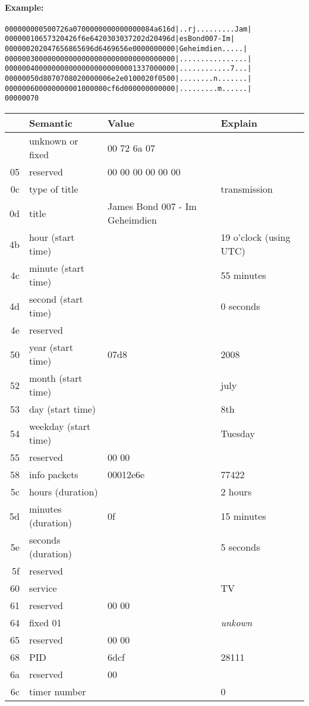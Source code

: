 \documentclass{scrartcl}
\providecommand*\toprule{\hline}
\providecommand*\midrule{\hline}
\providecommand*\bottomrule{\hline}
\begin{document}
\paragraph{Example:}
{\small
\begin{alltt}
00000000  05 00 72 6a 07 00 00 00  00 00 00 00 08 4a 61 6d  |..rj.........Jam|
00000010  65 73 20 42 6f 6e 64 20  30 30 37 20 2d 20 49 6d  |es Bond 007 - Im|
00000020  20 47 65 68 65 69 6d 64  69 65 6e 00 00 00 00 00  | Geheimdien.....|
00000030  00 00 00 00 00 00 00 00  00 00 00 00 00 00 00 00  |................|
00000040  00 00 00 00 00 00 00 00  00 00 00 13 37 00 00 00  |............7...|
00000050  d8 07 07 08 02 00 00 00  6e 2e 01 00 02 0f 05 00  |........n.......|
00000060  00 00 00 00 01 00 00 00  cf 6d 00 00 00 00 00 00  |.........m......|
00000070
\end{alltt}
}

\noindent\begin{tabularx}{\textwidth}{>{\ttfamily}r@{:\hskip2\tabcolsep}l>{\ttfamily}l>{\raggedright}X}
    \toprule
    \multicolumn1{r@{\quad}}{Pos.} & Semantic & Value & Explain\tabularnewline
    \midrule
    00 & unknown or fixed & 05 00 72 6a 07 & \tabularnewline{}
    05 & reserved      & 00 00 00 00 00 00 00 & \tabularnewline{}
    0c & type of title & 08 & transmission\tabularnewline{}
    0d & title         & James Bond 007 - Im Geheimdien & \tabularnewline{}
    4b & hour (start time) & 13 & 19 o'clock (using UTC)\tabularnewline{}
    4c & minute (start time) & 37 & 55 minutes\tabularnewline{}
    4d & second (start time) & 00 & 0 seconds\tabularnewline{}
    4e & reserved            & 0000 & \tabularnewline{}
    50 & year (start time)   & 07d8 & 2008\tabularnewline{}
    52 & month (start time)  & 07 & july\tabularnewline{}
    53 & day (start time)    & 08 & 8th\tabularnewline{}
    54 & weekday (start time) & 02 & Tuesday\tabularnewline{}
    55 & reserved      & 00 00 00 & \tabularnewline{}
    58 & info packets  & 00012e6e & 77422\tabularnewline{}
    5c & hours (duration) & 02 & 2 hours\tabularnewline{}
    5d & minutes (duration) & 0f & 15 minutes\tabularnewline{}
    5e & seconds (duration) & 05 & 5 seconds\tabularnewline{}
    5f & reserved      & 00 & \tabularnewline{}
    60 & service       & 00 & TV\tabularnewline{}
    61 & reserved      & 00 00 00\tabularnewline{}
    64 & fixed 01      & 01 & \emph{unkown}\tabularnewline{}
    65 & reserved      & 00 00 00& \tabularnewline{}
    68 & PID           & 6dcf & 28111\tabularnewline{}
    6a & reserved      & 00 00 & \tabularnewline{}
    6c & timer number  & 00000000 & 0\tabularnewline
    \bottomrule
  \end{tabularx}
\end{document}
